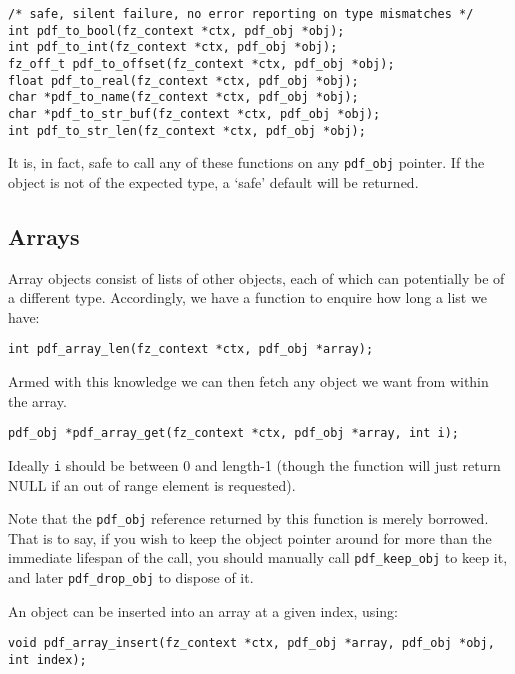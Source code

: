 \documentclass[oneside]{book}
\begin{document}
\begin{lstlisting}
/* safe, silent failure, no error reporting on type mismatches */
int pdf_to_bool(fz_context *ctx, pdf_obj *obj);
int pdf_to_int(fz_context *ctx, pdf_obj *obj);
fz_off_t pdf_to_offset(fz_context *ctx, pdf_obj *obj);
float pdf_to_real(fz_context *ctx, pdf_obj *obj);
char *pdf_to_name(fz_context *ctx, pdf_obj *obj);
char *pdf_to_str_buf(fz_context *ctx, pdf_obj *obj);
int pdf_to_str_len(fz_context *ctx, pdf_obj *obj);
\end{lstlisting}

It is, in fact, safe to call any of these functions on any \texttt{pdf\_obj} pointer. If the object is not of the expected type, a `safe' default will be returned.

\subsection{Arrays}

Array objects consist of lists of other objects, each of which can  potentially be of a different type. Accordingly, we have a function to enquire how long a list we have:

\begin{lstlisting}
int pdf_array_len(fz_context *ctx, pdf_obj *array);
\end{lstlisting}

Armed with this knowledge we can then fetch any object we want from within the array.

\begin{lstlisting}
pdf_obj *pdf_array_get(fz_context *ctx, pdf_obj *array, int i);
\end{lstlisting}

Ideally \texttt{i} should be between 0 and length-1 (though the function will just return NULL if an out of range element is requested).

Note that the \texttt{pdf\_obj} reference returned by this function is merely borrowed. That is to say, if you wish to keep the object pointer around for more than the immediate lifespan of the call, you should manually call \texttt{pdf\_keep\_obj} to keep it, and later \texttt{pdf\_drop\_obj} to dispose of it.

An object can be inserted into an array at a given index, using:

\begin{lstlisting}
void pdf_array_insert(fz_context *ctx, pdf_obj *array, pdf_obj *obj, int index);
\end{lstlisting}
\end{document}
